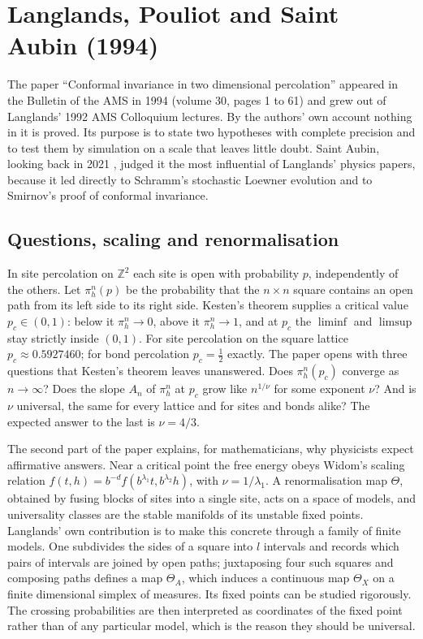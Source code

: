 \section{Langlands, Pouliot and Saint Aubin (1994)}\label{perc:sec:lps}

The paper ``Conformal invariance in two dimensional percolation'' \cite{lps1994} appeared in the Bulletin of the AMS in 1994 (volume 30, pages 1 to 61) and grew out of Langlands' 1992 AMS Colloquium lectures. By the authors' own account nothing in it is proved. Its purpose is to state two hypotheses with complete precision and to test them by simulation on a scale that leaves little doubt. Saint Aubin, looking back in 2021 \cite{saintaubin2021}, judged it the most influential of Langlands' physics papers, because it led directly to Schramm's stochastic Loewner evolution and to Smirnov's proof of conformal invariance.

\subsection{Questions, scaling and renormalisation}

In site percolation on $\mathbb{Z}^2$ each site is open with probability $p$, independently of the others. Let $\pi^n_h(p)$ be the probability that the $n\times n$ square contains an open path from its left side to its right side. Kesten's theorem supplies a critical value $p_c\in(0,1)$: below it $\pi^n_h\to0$, above it $\pi^n_h\to1$, and at $p_c$ the $\liminf$ and $\limsup$ stay strictly inside $(0,1)$. For site percolation on the square lattice $p_c\approx0.5927460$; for bond percolation $p_c = \tfrac12$ exactly. The paper opens with three questions that Kesten's theorem leaves unanswered. Does $\pi^n_h(p_c)$ converge as $n\to\infty$? Does the slope $A_n$ of $\pi^n_h$ at $p_c$ grow like $n^{1/\nu}$ for some exponent $\nu$? And is $\nu$ universal, the same for every lattice and for sites and bonds alike? The expected answer to the last is $\nu = 4/3$.

The second part of the paper explains, for mathematicians, why physicists expect affirmative answers. Near a critical point the free energy obeys Widom's scaling relation $f(t,h) = b^{-d}f(b^{\lambda_1}t,b^{\lambda_2}h)$, with $\nu = 1/\lambda_1$. A renormalisation map $\Theta$, obtained by fusing blocks of sites into a single site, acts on a space of models, and universality classes are the stable manifolds of its unstable fixed points. Langlands' own contribution is to make this concrete through a family of finite models. One subdivides the sides of a square into $l$ intervals and records which pairs of intervals are joined by open paths; juxtaposing four such squares and composing paths defines a map $\Theta_A$, which induces a continuous map $\Theta_X$ on a finite dimensional simplex of measures. Its fixed points can be studied rigorously. The crossing probabilities are then interpreted as coordinates of the fixed point rather than of any particular model, which is the reason they should be universal.

